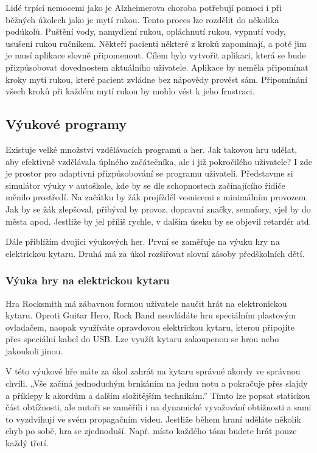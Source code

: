 Lidé trpící nemocemi jako je Alzheimerova choroba potřebují pomoci i při běžných úkolech jako je mytí rukou. Tento proces lze rozdělit do několika podúkolů. Puštění vody, namydlení rukou, opláchnutí rukou, vypnutí vody, usušení rukou ručníkem. Někteří pacienti některé z kroků zapomínají, a poté jim je musí aplikace slovně připomenout. Cílem bylo vytvořit aplikaci, která se bude přizpůsobovat dovednostem aktuálního uživatele. Aplikace by neměla připomínat kroky mytí rukou, které pacient zvládne bez nápovědy provést sám. Připomínání všech kroků při každém mytí rukou by mohlo vést k jeho frustraci\cite{10Dementia}.  

\subsection{Výukové programy}

Existuje velké množství vzdělávacích programů a her. Jak takovou hru udělat, aby efektivně vzdělávala úplného začátečníka, ale i již pokročilého uživatele? I zde je prostor pro adaptivní přizpůsobování se programu uživateli. Představme si simulátor výuky v autoškole, kde by se dle schopnostech začínajícího řidiče měnilo prostředí. Na začátku by žák projížděl vesnicemi s minimálním provozem. Jak by se žák zlepšoval, přibýval by provoz, dopravní značky, semafory, vjel by do města apod. Jestliže by jel příliš rychle, v dalším úseku by se objevil retardér atd.

Dále přiblížím dvojici výukových her. První se zaměřuje na výuku hry na elektrickou kytaru. Druhá má za úkol rozšiřovat slovní zásoby předškolních dětí.

\subsubsection{Výuka hry na elektrickou kytaru}

Hra Rocksmith má zábavnou formou uživatele naučit hrát na elektronickou kytaru. Oproti Guitar Hero, Rock Band neovládáte hru speciálním plastovým ovladačem, naopak využíváte opravdovou elektrickou kytaru, kterou připojíte přes speciální kabel do USB. Lze využít kytaru zakoupenou se hrou nebo jakoukoli jinou.

V této výukové hře máte za úkol zahrát na kytaru správné akordy ve správnou chvíli. „Vše začíná jednoduchým brnkáním na jednu notu a pokračuje přes slajdy a příklepy k akordům a dalším složitějším technikám.”\cite{12RocksmithRev} Tímto lze popsat statickou část obtížnosti, ale autoři se zaměřili i na dynamické vyvažování obtížnosti a sami to vyzdvihují ve svém propagačním videu\cite{13RocksmithVid}. Jestliže během hraní uděláte několik chyb po sobě, hra se zjednoduší. Např. místo každého tónu budete hrát pouze každý třetí.

